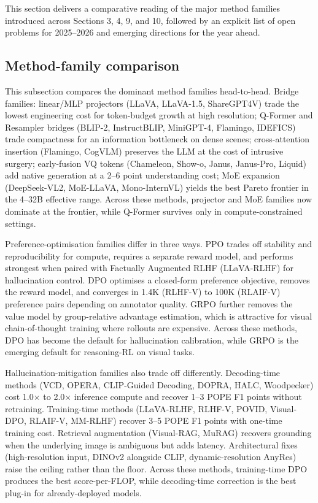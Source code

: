 This section delivers a comparative reading of the major method families introduced across Sections 3, 4, 9, and 10, followed by an explicit list of open problems for 2025--2026 and emerging directions for the year ahead.

\subsection{Method-family comparison}\label{method-family-comparison}

This subsection compares the dominant method families head-to-head. Bridge families: linear/MLP projectors (LLaVA, LLaVA-1.5, ShareGPT4V) trade the lowest engineering cost for token-budget growth at high resolution; Q-Former and Resampler bridges (BLIP-2, InstructBLIP, MiniGPT-4, Flamingo, IDEFICS) trade compactness for an information bottleneck on dense scenes; cross-attention insertion (Flamingo, CogVLM) preserves the LLM at the cost of intrusive surgery; early-fusion VQ tokens (Chameleon, Show-o, Janus, Janus-Pro, Liquid) add native generation at a 2--6 point understanding cost; MoE expansion (DeepSeek-VL2, MoE-LLaVA, Mono-InternVL) yields the best Pareto frontier in the 4--32B effective range. Across these methods, projector and MoE families now dominate at the frontier, while Q-Former survives only in compute-constrained settings.

Preference-optimisation families differ in three ways. PPO trades off stability and reproducibility for compute, requires a separate reward model, and performs strongest when paired with Factually Augmented RLHF (LLaVA-RLHF) for hallucination control. DPO optimises a closed-form preference objective, removes the reward model, and converges in 1.4K (RLHF-V) to 100K (RLAIF-V) preference pairs depending on annotator quality. GRPO further removes the value model by group-relative advantage estimation, which is attractive for visual chain-of-thought training where rollouts are expensive. Across these methods, DPO has become the default for hallucination calibration, while GRPO is the emerging default for reasoning-RL on visual tasks.

Hallucination-mitigation families also trade off differently. Decoding-time methods (VCD, OPERA, CLIP-Guided Decoding, DOPRA, HALC, Woodpecker) cost 1.0× to 2.0× inference compute and recover 1--3 POPE F1 points without retraining. Training-time methods (LLaVA-RLHF, RLHF-V, POVID, Visual-DPO, RLAIF-V, MM-RLHF) recover 3--5 POPE F1 points with one-time training cost. Retrieval augmentation (Visual-RAG, MuRAG) recovers grounding when the underlying image is ambiguous but adds latency. Architectural fixes (high-resolution input, DINOv2 alongside CLIP, dynamic-resolution AnyRes) raise the ceiling rather than the floor. Across these methods, training-time DPO produces the best score-per-FLOP, while decoding-time correction is the best plug-in for already-deployed models.

